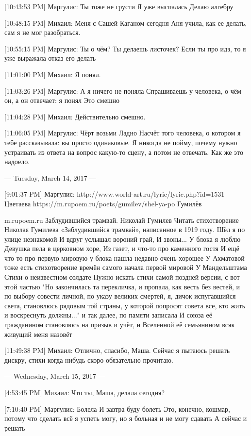 \documentclass{article}
\begin{document}
[10:43:53 PM] Маргулис:
Ты тоже не грусти
 Я уже выспалась
 Делаю алгебру

[10:48:15 PM] Михаил:
Меня с Сашей Каганом сегодня Аня учила, как ее делать, сам я не мог разобраться.

[10:55:15 PM] Маргулис:
Ты о чём?
 Ты делаешь листочек?
 Если ты про идз, то я уже выражала отказ его делать

[11:01:00 PM] Михаил:
Я понял.

[11:03:26 PM] Маргулис:
А я ничего не поняла
 Спрашиваешь у человека, о чём он, а он отвечает: я понял
 Это смешно

[11:04:28 PM] Михаил:
Действительно смешно.

[11:06:05 PM] Маргулис:
Чёрт возьми
 Ладно
 Насчёт того человека, о котором я тебе рассказывала: вы просто одинаковые.
 Я никогда не пойму, почему нужно устраивать из ответа на вопрос какую-то сцену, а потом не отвечать.
 Как же это надоело.

--- Tuesday, March 14, 2017 ---

[9:01:37 PM] Маргулис:
http://www.world-art.ru/lyric/lyric.php?id=1531
 Цветаева
 https://m.rupoem.ru/poets/gumilev/shel-ya-po
Гумилёв

m.rupoem.ru
Заблудившийся трамвай. Николай Гумилев
Читать стихотворение Николая Гумилева «Заблудившийся трамвай», написанное в 1919 году. Шёл я по улице незнакомой И вдруг услышал вороний грай, И звоны...
 У блока я люблю Девушка пела в церковном хоре, Из газет, и что-то про каменного гостя
 И ещё что-то про первую мировую у блока нашла недавно очень хорошее
 У Ахматовой тоже есть стихотворение времён самого начала первой мировой
 У Мандельштама Стихи о неизвестном солдате
 Нужно искать стихи самой поздней версии, с вот этой частью 
"Но закончилась та перекличка, и пропала, как весть без вестей, и по выбору совести личной, по указу великих смертей, я, дичок испугавшийся света, становлюсь рядовым той страны, у которой попросят совета все, кто жить и воскреснуть должны..." и так далее, по памяти записала
 И союза её гражданином становлюсь на призыв и учёт, и Вселенной её семьянином всяк живущий меня назовёт

[11:49:38 PM] Михаил:
Отлично, спасибо, Маша. Сейчас я пытаюсь решать дискру, стихи когда-нибудь скоро обязательно прочитаю.

--- Wednesday, March 15, 2017 ---

[4:53:45 PM] Михаил:
Что ты, Маша, делала сегодня?

[7:10:40 PM] Маргулис:
Болела
 И завтра буду болеть
 Это, конечно, кошмар, потому что сделать всё я успеть могу, но я больная и не могу сдавать
 А сейчас и решать
\end{document}
